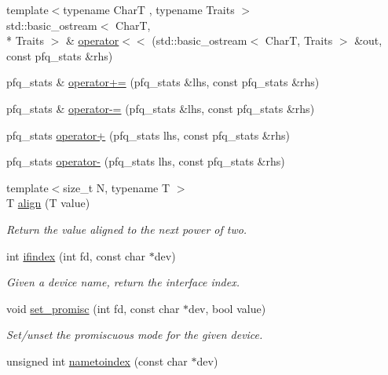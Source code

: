 \begin{DoxyCompactItemize}
\item 
{\footnotesize template$<$typename Char\+T , typename Traits $>$ }\\std\+::basic\+\_\+ostream$<$ Char\+T, \\*
Traits $>$ \& \hyperlink{namespacepfq_a1c2bda68e2e2c718ebd80519034002a3}{operator$<$$<$} (std\+::basic\+\_\+ostream$<$ Char\+T, Traits $>$ \&out, const pfq\+\_\+stats \&rhs)
\item 
pfq\+\_\+stats \& \hyperlink{namespacepfq_ae140b453ea425ae677dfbc69a51370f8}{operator+=} (pfq\+\_\+stats \&lhs, const pfq\+\_\+stats \&rhs)
\item 
pfq\+\_\+stats \& \hyperlink{namespacepfq_aa7874ca8c38d2bb9b66a33a6c2bb0fc1}{operator-\/=} (pfq\+\_\+stats \&lhs, const pfq\+\_\+stats \&rhs)
\item 
pfq\+\_\+stats \hyperlink{namespacepfq_a1db1dc5635be457a7ca4cd9148ceae19}{operator+} (pfq\+\_\+stats lhs, const pfq\+\_\+stats \&rhs)
\item 
pfq\+\_\+stats \hyperlink{namespacepfq_ad01713142f8fa670ff8614b9f2bab3b8}{operator-\/} (pfq\+\_\+stats lhs, const pfq\+\_\+stats \&rhs)
\item 
{\footnotesize template$<$size\+\_\+t N, typename T $>$ }\\T \hyperlink{namespacepfq_a9db75e7163c5f764248401d10a2a3f9b}{align} (T value)
\begin{DoxyCompactList}\small\item\em Return the value aligned to the next power of two. \end{DoxyCompactList}\item 
int \hyperlink{namespacepfq_a251ac5cc269aa123009754edf62ab8b4}{ifindex} (int fd, const char $\ast$dev)
\begin{DoxyCompactList}\small\item\em Given a device name, return the interface index. \end{DoxyCompactList}\item 
void \hyperlink{namespacepfq_a62b9f1831dc714353f6edcb66a4fad4d}{set\+\_\+promisc} (int fd, const char $\ast$dev, bool value)
\begin{DoxyCompactList}\small\item\em Set/unset the promiscuous mode for the given device. \end{DoxyCompactList}\item 
unsigned int \hyperlink{namespacepfq_a55d90c336462015bb2b4e40f9f853847}{nametoindex} (const char $\ast$dev)

\end{DoxyCompactItemize}
